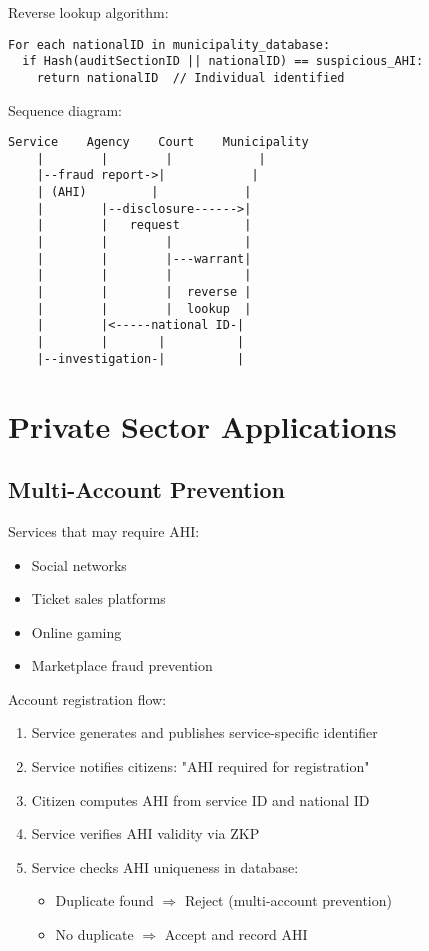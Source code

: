 Reverse lookup algorithm:
\begin{verbatim}
For each nationalID in municipality_database:
  if Hash(auditSectionID || nationalID) == suspicious_AHI:
    return nationalID  // Individual identified
\end{verbatim}

Sequence diagram:
\begin{verbatim}
Service    Agency    Court    Municipality
    |        |        |            |
    |--fraud report->|            |
    | (AHI)         |            |
    |        |--disclosure------>|
    |        |   request         |
    |        |        |          |
    |        |        |---warrant|
    |        |        |          |
    |        |        |  reverse |
    |        |        |  lookup  |
    |        |<-----national ID-|
    |        |       |          |
    |--investigation-|          |
\end{verbatim}

\section{Private Sector Applications}

\subsection{Multi-Account Prevention}

Services that may require AHI:
\begin{itemize}
  \item Social networks
  \item Ticket sales platforms
  \item Online gaming
  \item Marketplace fraud prevention
\end{itemize}

Account registration flow:
\begin{enumerate}
  \item Service generates and publishes service-specific identifier
  \item Service notifies citizens: "AHI required for registration"
  \item Citizen computes AHI from service ID and national ID
  \item Service verifies AHI validity via ZKP
  \item Service checks AHI uniqueness in database:
    \begin{itemize}
      \item Duplicate found $\Rightarrow$ Reject (multi-account prevention)
      \item No duplicate $\Rightarrow$ Accept and record AHI
    \end{itemize}
\end{enumerate}

